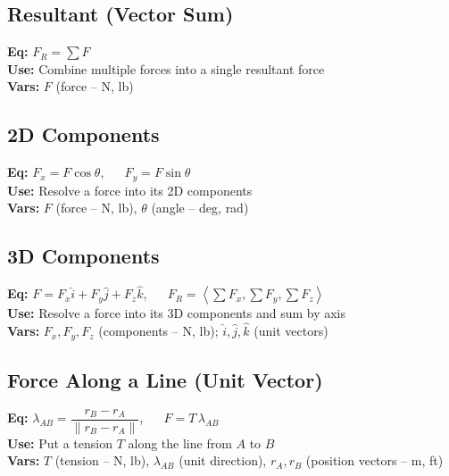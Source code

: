 \documentclass[10pt]{article}
\begin{document}
\begin{multicols}{2}
    \subsection{Resultant (Vector Sum)}
    \textbf{Eq:} $F_R = \sum F$\\
    \textbf{Use:} Combine multiple forces into a single resultant force\\
    \textbf{Vars:} $F$ (force -- N, lb)\\[2pt]

    \subsection{2D Components}
    \textbf{Eq:} $F_x = F \cos\theta$, $\quad$ $F_y = F \sin\theta$\\
    \textbf{Use:} Resolve a force into its 2D components\\
    \textbf{Vars:} $F$ (force -- N, lb), $\theta$ (angle -- deg, rad)\\[2pt]

    \subsection{3D Components}
    \textbf{Eq:} $F = F_x \hat{i} + F_y \hat{j} + F_z \hat{k}$, $\quad$ $F_R = \left\langle \sum F_x, \sum F_y, \sum F_z \right\rangle$\\
    \textbf{Use:} Resolve a force into its 3D components and sum by axis\\
    \textbf{Vars:} $F_x, F_y, F_z$ (components -- N, lb); $\hat{i},\hat{j},\hat{k}$ (unit vectors)\\[2pt]

    \subsection{Force Along a Line (Unit Vector)}
    \textbf{Eq:} $\lambda_{AB}=\dfrac{r_B-r_A}{\lVert r_B-r_A\rVert}$, $\quad$ $F = T\,\lambda_{AB}$\\
    \textbf{Use:} Put a tension $T$ along the line from $A$ to $B$\\
    \textbf{Vars:} $T$ (tension -- N, lb), $\lambda_{AB}$ (unit direction), $r_A,r_B$ (position vectors -- m, ft)\\
\end{multicols}
\end{document}
